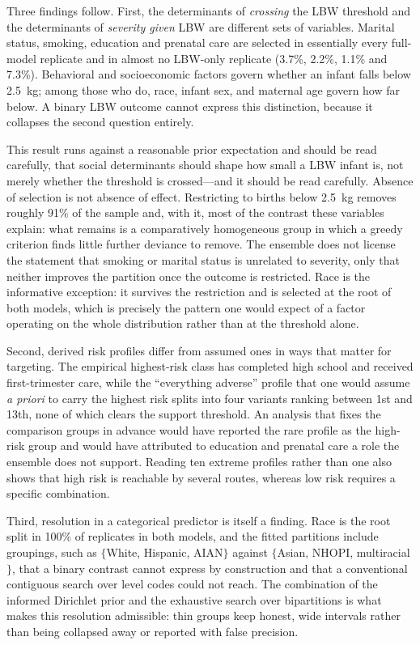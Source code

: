 \documentclass[AMA]{USG}
\begin{document}
Three findings follow.
First, the determinants of \emph{crossing} the LBW threshold and the determinants of \emph{severity given} LBW are different sets of variables. Marital status, smoking, education and prenatal care are selected in essentially every full-model replicate and in almost no LBW-only replicate (3.7\%, 2.2\%, 1.1\% and 7.3\%). Behavioral and socioeconomic factors govern whether an infant falls below 2.5~kg; among those who do, race, infant sex, and maternal age govern how far below. A binary LBW outcome cannot express this distinction, because it collapses the second question entirely.

This result runs against a reasonable prior expectation and should be read carefully, that social determinants should shape how small a LBW infant is, not merely whether the threshold is crossed---and it should be read carefully. Absence of selection is not absence of effect. Restricting to births below 2.5~kg removes roughly 91\% of the sample and, with it, most of the contrast these variables explain: what remains is a comparatively homogeneous group in which a greedy criterion finds little further deviance to remove. The ensemble does not license the statement that smoking or marital status is unrelated to severity, only that neither improves the partition once the outcome is restricted. Race is the informative exception: it survives the restriction and is selected at the root of both models, which is precisely the pattern one would expect of a factor operating on the whole distribution rather than at the threshold alone.

Second, derived risk profiles differ from assumed ones in ways that matter for targeting. The empirical highest-risk class has completed high school and received first-trimester care, while the ``everything adverse'' profile that one would assume \emph{a priori} to carry the highest risk splits into four variants ranking between 1st and 13th, none of which clears the support threshold. An analysis that fixes the comparison groups in advance would have reported the rare profile as the high-risk group and would have attributed to education and prenatal care a role the ensemble does not support. Reading ten extreme profiles rather than one also shows that high risk is reachable by several routes, whereas low risk requires a specific combination.


Third, resolution in a categorical predictor is itself a finding. Race is the root split in 100\% of replicates in both models, and the fitted partitions include groupings, such as $\{$White, Hispanic, AIAN$\}$ against $\{$Asian, NHOPI, multiracial$\}$, that a binary contrast cannot express by construction and that a conventional contiguous search over level codes could not reach. The combination of the informed Dirichlet prior and the exhaustive search over bipartitions is what makes this resolution admissible: thin groups keep honest, wide intervals rather than being collapsed away or reported with false precision.
\end{document}
